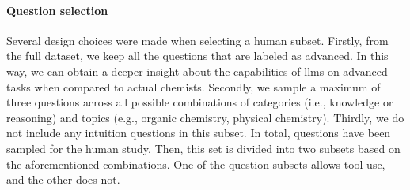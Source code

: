 \paragraph{Question selection}

Several design choices were made when selecting a human subset. Firstly, from the full dataset, we keep all the questions that are labeled as advanced. In this way, we can obtain a deeper insight about the capabilities of \glspl{llm} on advanced tasks
when compared to actual chemists. Secondly, we sample a maximum of three questions across all possible combinations of categories (i.e., knowledge or reasoning) and topics (e.g., organic chemistry, physical chemistry). Thirdly, we do not include any intuition questions
in this subset. In total,  questions have been sampled for the human study. Then, this set is divided into two subsets based on the aforementioned combinations. One of the question subsets allows tool use, and the other does not.

